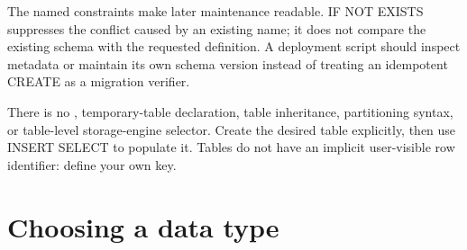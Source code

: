 The named constraints make later maintenance readable. IF NOT EXISTS suppresses the conflict caused by an existing name; it does not compare the existing schema with the requested definition. A deployment script should inspect metadata or maintain its own schema version instead of treating an idempotent CREATE as a migration verifier.

There is no , temporary-table declaration, table inheritance, partitioning syntax, or table-level storage-engine selector. Create the desired table explicitly, then use INSERT SELECT to populate it. Tables do not have an implicit user-visible row identifier: define your own key.


\section{Choosing a data type}
\label{sql:types}

